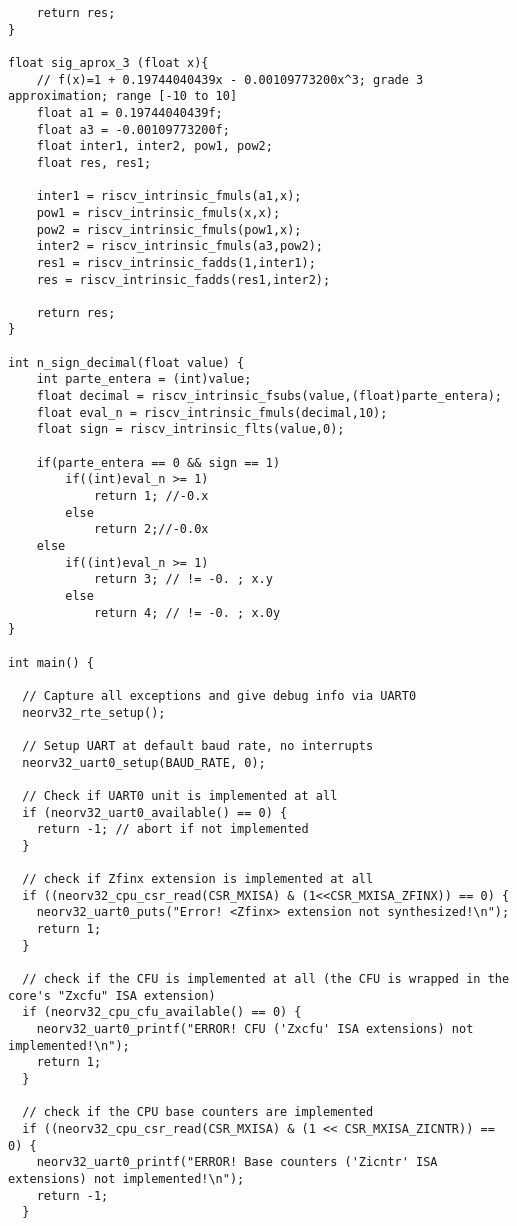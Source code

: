 \begin{code}
\begin{verbatim}
    return res;
}

float sig_aprox_3 (float x){
    // f(x)=1 + 0.19744040439x - 0.00109773200x^3; grade 3 approximation; range [-10 to 10]
    float a1 = 0.19744040439f;
    float a3 = -0.00109773200f;
    float inter1, inter2, pow1, pow2;
    float res, res1;
    
    inter1 = riscv_intrinsic_fmuls(a1,x);
    pow1 = riscv_intrinsic_fmuls(x,x);
    pow2 = riscv_intrinsic_fmuls(pow1,x);
    inter2 = riscv_intrinsic_fmuls(a3,pow2);
    res1 = riscv_intrinsic_fadds(1,inter1);
    res = riscv_intrinsic_fadds(res1,inter2);
    
    return res;
}

int n_sign_decimal(float value) {
    int parte_entera = (int)value;
    float decimal = riscv_intrinsic_fsubs(value,(float)parte_entera);
    float eval_n = riscv_intrinsic_fmuls(decimal,10);
    float sign = riscv_intrinsic_flts(value,0);

    if(parte_entera == 0 && sign == 1)
        if((int)eval_n >= 1)
            return 1; //-0.x
        else
            return 2;//-0.0x
    else 
        if((int)eval_n >= 1)
            return 3; // != -0. ; x.y
        else
            return 4; // != -0. ; x.0y 
}

int main() {
    
  // Capture all exceptions and give debug info via UART0
  neorv32_rte_setup();

  // Setup UART at default baud rate, no interrupts
  neorv32_uart0_setup(BAUD_RATE, 0);

  // Check if UART0 unit is implemented at all
  if (neorv32_uart0_available() == 0) {
    return -1; // abort if not implemented
  }

  // check if Zfinx extension is implemented at all
  if ((neorv32_cpu_csr_read(CSR_MXISA) & (1<<CSR_MXISA_ZFINX)) == 0) {
    neorv32_uart0_puts("Error! <Zfinx> extension not synthesized!\n");
    return 1;
  }

  // check if the CFU is implemented at all (the CFU is wrapped in the core's "Zxcfu" ISA extension)
  if (neorv32_cpu_cfu_available() == 0) {
    neorv32_uart0_printf("ERROR! CFU ('Zxcfu' ISA extensions) not implemented!\n");
    return 1;
  }

  // check if the CPU base counters are implemented
  if ((neorv32_cpu_csr_read(CSR_MXISA) & (1 << CSR_MXISA_ZICNTR)) == 0) {
    neorv32_uart0_printf("ERROR! Base counters ('Zicntr' ISA extensions) not implemented!\n");
    return -1;
  }


\end{verbatim}
\end{code}
